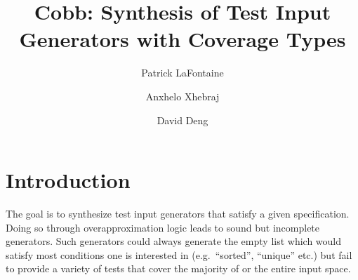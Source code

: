 \documentclass[review, sigplan]{acmart}
\begin{document}
\title{Cobb: Synthesis of Test Input Generators with Coverage Types}

\author{Patrick LaFontaine}
\author{Anxhelo Xhebraj}
\author{David Deng}


\renewcommand{\shortauthors}{LaFontaine et al.}










\maketitle

\section{Introduction}
The goal is to synthesize test input generators that satisfy a given specification. Doing so through overapproximation logic leads to sound but incomplete generators. Such generators could always generate the empty list which would satisfy most conditions one is interested in (e.g.~``sorted'', ``unique'' etc.) but fail to provide a variety of tests that cover the majority of or the entire input space.
\end{document}
